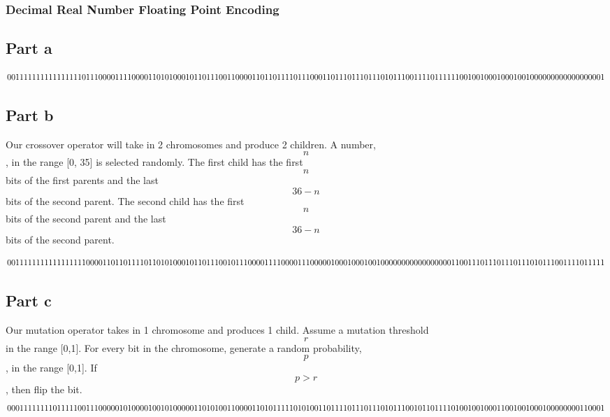 \documentclass[a4paper]{article}
\begin{document}
\subsubsection{Decimal Real Number Floating Point Encoding}
\subsection{Part a}
\[
0011 11111111111111 0111 00001111000011 \\
0101 00010110111001 1000 01101101111011 \\
1000 11011101110111 0101 11001111011111 \\
1001 00100010001001 0000 00000000000001 \\
\]
\subsection{Part b}
Our crossover operator will take in 2 chromosomes and produce 2 children. A number, $$n$$,  in the range [0, 35] is selected randomly. The first child has the first $$n$$ bits of the first parents and the last $$36-n$$ bits of the second parent. The second child has the first $$n$$ bits of the second parent and the last $$36-n$$ bits of the second parent.

\[
0011 11111111111111 1000 01101101111011 \\
0101 00010110111001 0111 00001111000011 \\
1000 00100010001001 0000 00000000000001 \\
1001 11011101110111 0101 11001111011111 \\
\]
\subsection{Part c}
Our mutation operator takes in 1 chromosome and produces 1 child. Assume a mutation threshold $$r$$ in the range [0,1]. For every bit in the chromosome, generate a random probability, $$p$$, in the range [0,1]. If $$p > r$$, then flip the bit.
\[
0001 11111110111110 0111 00000101000010 \\
0101 00000110101001 1000 01101011111010 \\
1001 10111101110111 0101 11001011011110 \\
1001 00100011001001 0001 00000000110001 \\
\]
\end{document}
